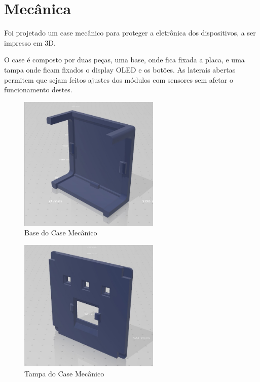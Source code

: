 \documentclass[../monografia.tex]{subfiles}
\begin{document}
\section{Mecânica}

Foi projetado um case mecânico para proteger a eletrônica dos dispositivos, a ser impresso em 3D. 

O case é composto por duas peças, uma base, onde fica fixada a placa, e uma tampa onde ficam fixados o display OLED e os botões. As laterais abertas permitem que sejam feitos ajustes dos módulos com sensores sem afetar o funcionamento destes. 

\begin{figure}[h]
	\centering
	\includegraphics[width=0.6\textwidth]{mec-base.jpeg}
	\caption{Base do Case Mecânico}
	\label{fig:mec1}
\end{figure}

\begin{figure}[h]
	\centering
	\includegraphics[width=0.6\textwidth]{mec-tampa.jpeg}
	\caption{Tampa do Case Mecânico}
	\label{fig:mec2}
\end{figure}

\end{document}
